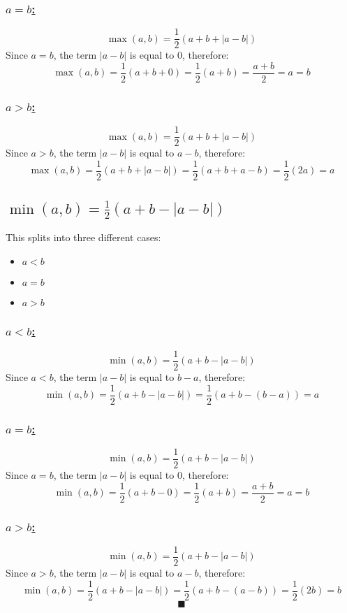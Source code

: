 \documentclass[a4paper, 12pt]{article}
\newcommand{\sub}[1]{\subsection{\underline{#1}}}
\newcommand{\subsub}[1]{\subsubsection{\underline{#1}}}
\newcommand{\?}{\stackrel{?}{=}}
\renewcommand{\qed}{$$\blacksquare$$}
\begin{document}
\subsub{$a=b$:}
$$\max(a,b)=\frac{1}{2}(a+b+|a-b|)$$
Since $a=b$, the term $|a-b|$ is equal to $0$, therefore:
$$ \max(a,b)=\frac{1}{2}(a+b+0) = \frac{1}{2}(a+b) = \frac{a+b}{2} = a= b $$

\subsub{$a>b$:}
$$\max(a,b)=\frac{1}{2}(a+b+|a-b|)$$
Since $a>b$, the term $|a-b|$ is equal to $a-b$, therefore:
$$ \max(a,b)=\frac{1}{2}(a+b+|a-b|) = \frac{1}{2}(a+b+a-b) = \frac{1}{2}(2a) = a $$
\pagebreak

\sub{$\min(a,b)=\frac{1}{2}(a+b-|a-b|)$}
This splits into three different cases:
\begin{itemize}
    \item $a<b$
    \item $a=b$
    \item $a>b$
\end{itemize}
\subsub{$a<b$:}
$$\min(a,b)=\frac{1}{2}(a+b-|a-b|)$$
Since $a<b$, the term $|a-b|$ is equal to $b-a$, therefore:
$$ \min(a,b)=\frac{1}{2}(a+b-|a-b|) = \frac{1}{2}(a+b-(b-a)) = a$$

\subsub{$a=b$:}
$$\min(a,b)=\frac{1}{2}(a+b-|a-b|)$$
Since $a=b$, the term $|a-b|$ is equal to $0$, therefore:
$$ \min(a,b)=\frac{1}{2}(a+b-0) = \frac{1}{2}(a+b) = \frac{a+b}{2} = a = b $$

\subsub{$a>b$:}
$$\min(a,b)=\frac{1}{2}(a+b-|a-b|)$$
Since $a>b$, the term $|a-b|$ is equal to $a-b$, therefore:
$$ \min(a,b)=\frac{1}{2}(a+b-|a-b|) = \frac{1}{2}(a+b-(a-b)) = \frac{1}{2}(2b) = b $$
\qed

\end{document}
